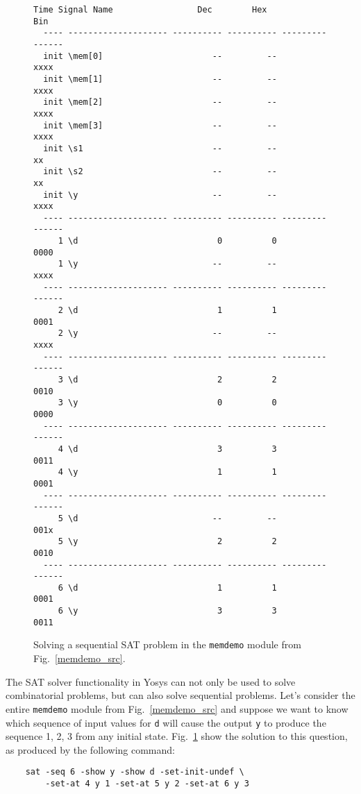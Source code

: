 \documentclass[9pt,technote,a4paper]{IEEEtran}
\begin{document}
\begin{figure}[t]
\begin{lstlisting}[basicstyle=\ttfamily\scriptsize]
  Time Signal Name                 Dec        Hex             Bin
  ---- -------------------- ---------- ---------- ---------------
  init \mem[0]                      --         --            xxxx
  init \mem[1]                      --         --            xxxx
  init \mem[2]                      --         --            xxxx
  init \mem[3]                      --         --            xxxx
  init \s1                          --         --              xx
  init \s2                          --         --              xx
  init \y                           --         --            xxxx
  ---- -------------------- ---------- ---------- ---------------
     1 \d                            0          0            0000
     1 \y                           --         --            xxxx
  ---- -------------------- ---------- ---------- ---------------
     2 \d                            1          1            0001
     2 \y                           --         --            xxxx
  ---- -------------------- ---------- ---------- ---------------
     3 \d                            2          2            0010
     3 \y                            0          0            0000
  ---- -------------------- ---------- ---------- ---------------
     4 \d                            3          3            0011
     4 \y                            1          1            0001
  ---- -------------------- ---------- ---------- ---------------
     5 \d                           --         --            001x
     5 \y                            2          2            0010
  ---- -------------------- ---------- ---------- ---------------
     6 \d                            1          1            0001
     6 \y                            3          3            0011
\end{lstlisting}
\caption{Solving a sequential SAT problem in the {\tt memdemo} module from Fig.~\ref{memdemo_src}.}
\label{memdemo_sat}
\end{figure}

The SAT solver functionality in Yosys can not only be used to solve
combinatorial problems, but can also solve sequential problems. Let's consider
the entire {\tt memdemo} module from Fig.~\ref{memdemo_src} and suppose we
want to know which sequence of input values for {\tt d} will cause the output
{\tt y} to produce the sequence 1, 2, 3 from any initial state.
Fig.~\ref{memdemo_sat} show the solution to this question, as produced by
the following command:

\begin{verbatim}
    sat -seq 6 -show y -show d -set-init-undef \
        -set-at 4 y 1 -set-at 5 y 2 -set-at 6 y 3
\end{verbatim}
\end{document}
